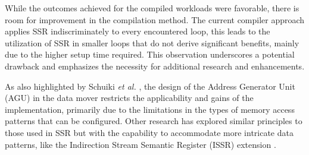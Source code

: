 While the outcomes achieved for the compiled workloads were favorable, there is room for improvement in the compilation method. The current compiler approach applies SSR indiscriminately to every encountered loop, this leads to the utilization of SSR in smaller loops that do not derive significant benefits, mainly due to the higher setup time required. This observation underscores a potential drawback and emphasizes the necessity for additional research and enhancements.

As also highlighted by Schuiki \textit{et al.} \cite{9068465}, the design of the Address Generator Unit (AGU) in the data mover restricts the applicability and gains of the implementation, primarily due to the limitations in the types of memory access patterns that can be configured. Other research has explored similar principles to those used in SSR but with the capability to accommodate more intricate data patterns, like the Indirection Stream Semantic Register (ISSR) extension \cite{9474230}.


